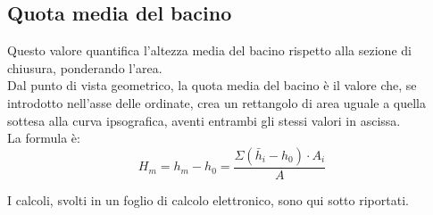 \subsection{Quota media del bacino}
Questo valore quantifica l'altezza media del bacino rispetto alla sezione di chiusura, ponderando l'area.\\
Dal punto di vista geometrico, la quota media del bacino è il valore che, se introdotto nell'asse delle ordinate, crea un rettangolo di area uguale a quella sottesa alla curva ipsografica, aventi entrambi gli stessi valori in ascissa.\\
La formula è:
\begin{equation}
    H_m = h_m - h_0 = \frac{\Sigma (\bar{h}_i - h_0) \cdot A_i}{A}
    \label{quota_media}
\end{equation}

\noindent I calcoli, svolti in un foglio di calcolo elettronico, sono qui sotto riportati.

